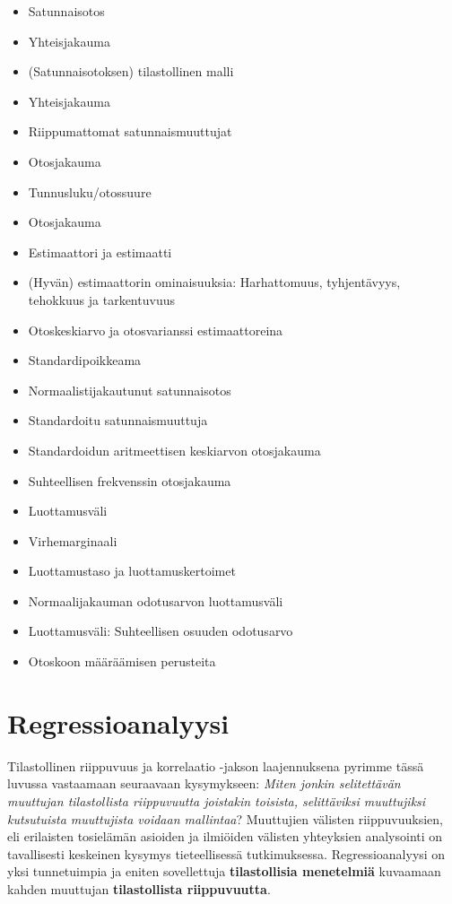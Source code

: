 \documentclass[
]{book}
\providecommand{\tightlist}{%
  \setlength{\itemsep}{0pt}\setlength{\parskip}{0pt}}
\begin{document}
\begin{itemize}
\tightlist
\item
  Satunnaisotos
\item
  Yhteisjakauma
\item
  (Satunnaisotoksen) tilastollinen malli
\item
  Yhteisjakauma
\item
  Riippumattomat satunnaismuuttujat
\item
  Otosjakauma
\item
  Tunnusluku/otossuure
\item
  Otosjakauma
\item
  Estimaattori ja estimaatti
\item
  (Hyvän) estimaattorin ominaisuuksia: Harhattomuus, tyhjentävyys, tehokkuus ja tarkentuvuus
\item
  Otoskeskiarvo ja otosvarianssi estimaattoreina
\item
  Standardipoikkeama
\item
  Normaalistijakautunut satunnaisotos
\item
  Standardoitu satunnaismuuttuja
\item
  Standardoidun aritmeettisen keskiarvon otosjakauma
\item
  Suhteellisen frekvenssin otosjakauma
\item
  Luottamusväli
\item
  Virhemarginaali
\item
  Luottamustaso ja luottamuskertoimet
\item
  Normaalijakauman odotusarvon luottamusväli
\item
  Luottamusväli: Suhteellisen osuuden odotusarvo
\item
  Otoskoon määräämisen perusteita
\end{itemize}

\hypertarget{luku10}{%
\chapter{Regressioanalyysi}\label{luku10}}

Tilastollinen riippuvuus ja korrelaatio -jakson laajennuksena pyrimme tässä luvussa vastaamaan seuraavaan kysymykseen: \emph{Miten jonkin selitettävän muuttujan tilastollista riippuvuutta joistakin toisista, selittäviksi muuttujiksi kutsutuista muuttujista voidaan mallintaa}? Muuttujien välisten riippuvuuksien, eli erilaisten tosielämän asioiden ja ilmiöiden välisten yhteyksien analysointi on tavallisesti keskeinen kysymys tieteellisessä tutkimuksessa. Regressioanalyysi on yksi tunnetuimpia ja eniten sovellettuja \textbf{tilastollisia menetelmiä} kuvaamaan kahden muuttujan \textbf{tilastollista riippuvuutta}.
\end{document}
